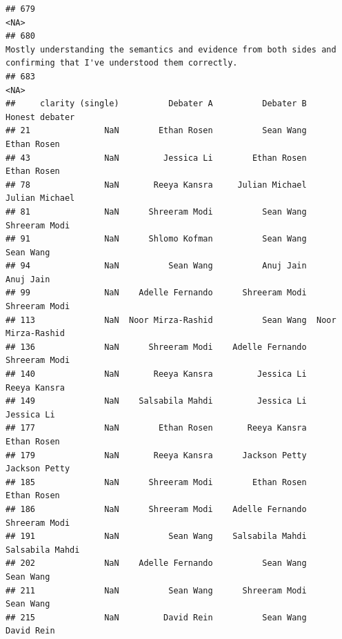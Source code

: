 \documentclass[
]{article}
\begin{document}
\begin{verbatim}
## 679                                                                                                                                                                                                                                                                                                                                                <NA>
## 680                                                                                                                                                                                                                                 Mostly understanding the semantics and evidence from both sides and confirming that I've understood them correctly.
## 683                                                                                                                                                                                                                                                                                                                                                <NA>
##     clarity (single)          Debater A          Debater B     Honest debater
## 21               NaN        Ethan Rosen          Sean Wang        Ethan Rosen
## 43               NaN         Jessica Li        Ethan Rosen        Ethan Rosen
## 78               NaN       Reeya Kansra     Julian Michael     Julian Michael
## 81               NaN      Shreeram Modi          Sean Wang      Shreeram Modi
## 91               NaN      Shlomo Kofman          Sean Wang          Sean Wang
## 94               NaN          Sean Wang          Anuj Jain          Anuj Jain
## 99               NaN    Adelle Fernando      Shreeram Modi      Shreeram Modi
## 113              NaN  Noor Mirza-Rashid          Sean Wang  Noor Mirza-Rashid
## 136              NaN      Shreeram Modi    Adelle Fernando      Shreeram Modi
## 140              NaN       Reeya Kansra         Jessica Li       Reeya Kansra
## 149              NaN    Salsabila Mahdi         Jessica Li         Jessica Li
## 177              NaN        Ethan Rosen       Reeya Kansra        Ethan Rosen
## 179              NaN       Reeya Kansra      Jackson Petty      Jackson Petty
## 185              NaN      Shreeram Modi        Ethan Rosen        Ethan Rosen
## 186              NaN      Shreeram Modi    Adelle Fernando      Shreeram Modi
## 191              NaN          Sean Wang    Salsabila Mahdi    Salsabila Mahdi
## 202              NaN    Adelle Fernando          Sean Wang          Sean Wang
## 211              NaN          Sean Wang      Shreeram Modi          Sean Wang
## 215              NaN         David Rein          Sean Wang         David Rein

\end{verbatim}
\end{document}
